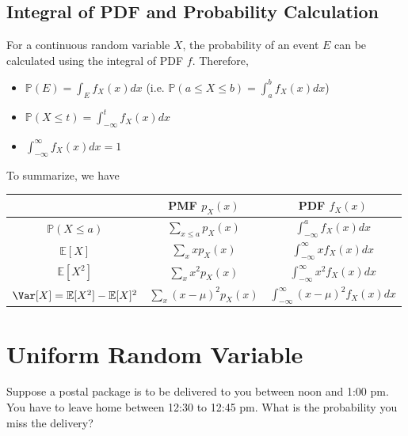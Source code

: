 \begin{minipage}{0.5\textwidth}
    \centering
    
\end{minipage}
\begin{minipage}{0.5\textwidth}
    \centering
    
\end{minipage}

\newpage
\subsection{Integral of PDF and Probability Calculation}
For a continuous random variable \(X\), the probability of an event \(E\) can be calculated using the integral of PDF \(f\). Therefore,
\begin{itemize}
    \item \(\mathbb{P}(E) = \int_E f_X (x)dx\) (i.e. \(\mathbb{P}(a \leq X \leq b) = \int_a^b f_X(x)dx\))
    \item \(\mathbb{P}(X \leq t) = \int_{-\infty}^t f_X (x)dx\) 
    \item \(\int_{-\infty}^{\infty} f_X (x)dx = 1\) 
\end{itemize}

To summarize, we have 
\begin{table}[H]
    \centering
    \begin{tabular}{c c c}
        \toprule
             & PMF \(p_X(x)\)  & PDF \(f_X(x)\)  \\
        \midrule
            \(\mathbb{P}(X \leq a)\)  & \(\sum_{x \leq a} p_X(x)\)  & \(\int_{-\infty}^a f_X(x)dx \)   \\[5pt]
            \(\mathbb{E}[X]\) & \(\sum_{x} xp_X(x)\) & \(\int_{-\infty}^{\infty} xf_X(x)dx \)  \\[5pt]
            \(\mathbb{E}[X^2]\) & \(\sum_{x} x^2p_X(x)\) & \(\int_{-\infty}^{\infty} x^2f_X(x)dx \)  \\[5pt]
            \(\Var[X] = \mathbb{E}[X^2] - \mathbb{E}[X]^2\) & \(\sum_{x} (x - \mu)^2 p_X(x)\)  & \(\int_{-\infty}^{\infty} (x - \mu)^2 f_X(x)dx \)  \\[5pt]
        \bottomrule
    \end{tabular}
\end{table} 

\section{Uniform Random Variable}
Suppose a postal package is to be delivered to you between noon and 1:00 pm. You have to leave home between 12:30 to 12:45 pm. What is the probability you miss the delivery?

